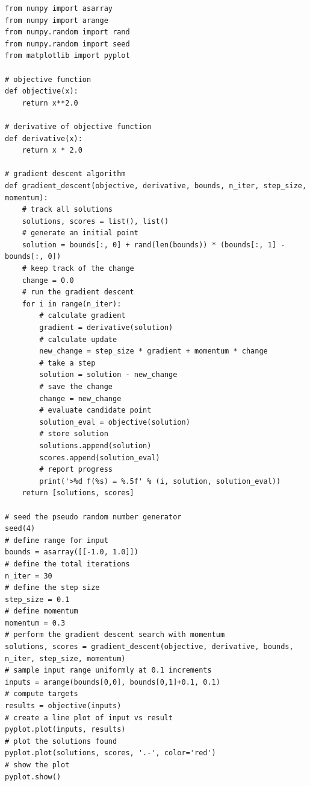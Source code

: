 \documentclass[%
oneside,                 %
final,                   %
10pt]{article}
\begin{document}
\begin{verbatim}
from numpy import asarray
from numpy import arange
from numpy.random import rand
from numpy.random import seed
from matplotlib import pyplot
 
# objective function
def objective(x):
	return x**2.0
 
# derivative of objective function
def derivative(x):
	return x * 2.0
 
# gradient descent algorithm
def gradient_descent(objective, derivative, bounds, n_iter, step_size, momentum):
	# track all solutions
	solutions, scores = list(), list()
	# generate an initial point
	solution = bounds[:, 0] + rand(len(bounds)) * (bounds[:, 1] - bounds[:, 0])
	# keep track of the change
	change = 0.0
	# run the gradient descent
	for i in range(n_iter):
		# calculate gradient
		gradient = derivative(solution)
		# calculate update
		new_change = step_size * gradient + momentum * change
		# take a step
		solution = solution - new_change
		# save the change
		change = new_change
		# evaluate candidate point
		solution_eval = objective(solution)
		# store solution
		solutions.append(solution)
		scores.append(solution_eval)
		# report progress
		print('>%d f(%s) = %.5f' % (i, solution, solution_eval))
	return [solutions, scores]
 
# seed the pseudo random number generator
seed(4)
# define range for input
bounds = asarray([[-1.0, 1.0]])
# define the total iterations
n_iter = 30
# define the step size
step_size = 0.1
# define momentum
momentum = 0.3
# perform the gradient descent search with momentum
solutions, scores = gradient_descent(objective, derivative, bounds, n_iter, step_size, momentum)
# sample input range uniformly at 0.1 increments
inputs = arange(bounds[0,0], bounds[0,1]+0.1, 0.1)
# compute targets
results = objective(inputs)
# create a line plot of input vs result
pyplot.plot(inputs, results)
# plot the solutions found
pyplot.plot(solutions, scores, '.-', color='red')
# show the plot
pyplot.show()

\end{verbatim}



\end{document}
